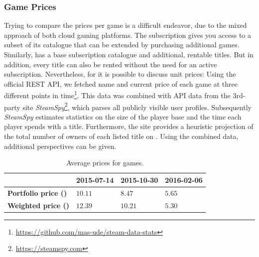 \subsubsection{Game Prices}

Trying to compare the prices per game is a difficult endeavor, due to the mixed approach of both cloud gaming platforms. The \gfnow subscription gives you access to a subset of its catalogue that can be extended by purchasing additional games. Similarly, \psnow has a base subscription catalogue and additional, rentable titles. But in addition, every title can also be rented without the need for an active subscription.
Nevertheless, for \steam it is possible to discuss unit prices: Using the official \acrshort{REST} \acrshort{API}, we fetched name and  current price of each game at three different points in time\footnote{\url{https://github.com/mas-ude/steam-data-stats}}. This data was combined with \acrshort{API} data from the 3rd-party site \textit{SteamSpy}\footnote{\url{https://steamspy.com}}, which parses all publicly visible \steam user profiles. Subsequently \textit{SteamSpy} estimates statistics on the size of the player base and the time each player spends with a title. Furthermore, the site provides a heuristic projection of the total number of owners of each listed title on \steam. Using the combined data, additional perspectives can be given.

\begin{table}
\centering
\caption{Average prices for \steam games.}
\label{tab:steam-price-stats}
\begin{tabu}{X[2]|X[r]X[r]X[r]}
	\toprule
	& \textbf{2015-07-14} & \textbf{2015-10-30} & \textbf{2016-02-06} \\
	\midrule
	\textbf{Portfolio price (\si{\EUR})} & $10.11$ & $8.47$ & $5.65$ \\
	\textbf{Weighted price (\si{\EUR})} & $12.39$ & $10.21$ & $5.30$ \\
	\bottomrule
\end{tabu}
\end{table}

